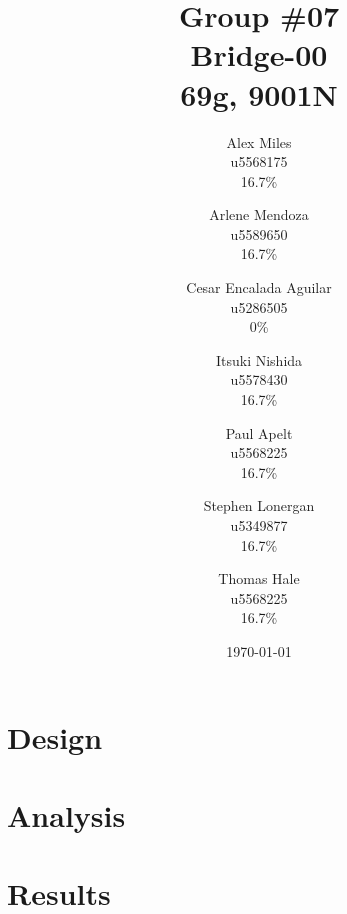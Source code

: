 \documentclass[12pt,titlepage]{article}
\begin{document}
	
	\title{
		Group \#07 \\
		Bridge-00 \\
		69g, 9001N
	}
	\date{\today}
	\author{
		Alex Miles \\ u5568175 \\ 16.7\%
		\and Arlene Mendoza \\ u5589650 \\ 16.7\%
		\and Cesar Encalada Aguilar \\ u5286505 \\ 0\%
		\and Itsuki Nishida \\ u5578430 \\ 16.7\%
		\and Paul Apelt \\ u5568225 \\ 16.7\%
		\and Stephen Lonergan \\ u5349877 \\ 16.7\%
		\and Thomas Hale \\ u5568225 \\ 16.7\%
	}
	\maketitle

	\section{Design}
	\section{Analysis}
	\section{Results}
	
\end{document}
